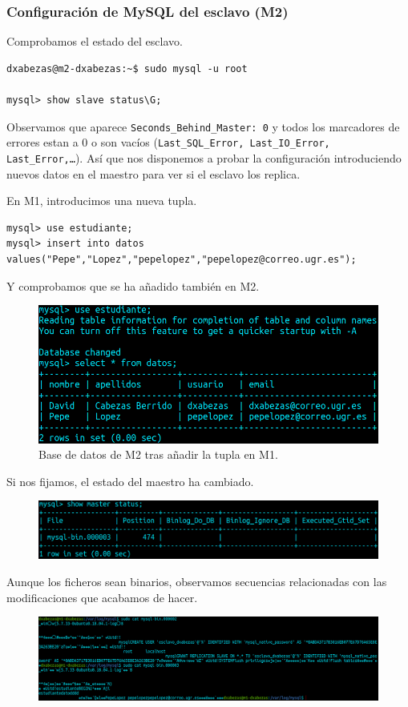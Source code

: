 \documentclass{article}
\begin{document}
\subsubsection*{Configuración de MySQL del esclavo (M2)}
Comprobamos el estado del esclavo.
\begin{Verbatim}
dxabezas@m2-dxabezas:~$ sudo mysql -u root

mysql> show slave status\G;
\end{Verbatim}
Observamos que aparece \texttt{Seconds\_Behind\_Master: 0} y todos los marcadores de errores estan a 0 o son vacíos
(\texttt{Last\_SQL\_Error, Last\_IO\_Error, Last\_Error,\ldots}). Así que nos disponemos a probar la configuración introduciendo
nuevos datos en el maestro para ver si el esclavo los replica.

En M1, introducimos una nueva tupla.
\begin{Verbatim}
mysql> use estudiante;
mysql> insert into datos values("Pepe","Lopez","pepelopez","pepelopez@correo.ugr.es");
\end{Verbatim}
Y comprobamos que se ha añadido también en M2.
\begin{figure}[H]
	\centering
	\includegraphics[width=140mm]{imgs/m2-master-slave}
	\caption{Base de datos de M2 tras añadir la tupla en M1.}
\end{figure}

Si nos fijamos, el estado del maestro ha cambiado.
\begin{figure}[H]
	\centering
	\includegraphics[width=150mm]{imgs/master-status2}
\end{figure}
Aunque los ficheros sean binarios, observamos secuencias relacionadas con las modificaciones que acabamos de hacer.
\begin{figure}[H]
	\centering
	\includegraphics[width=170mm]{imgs/cat-bins}
\end{figure}
\end{document}
